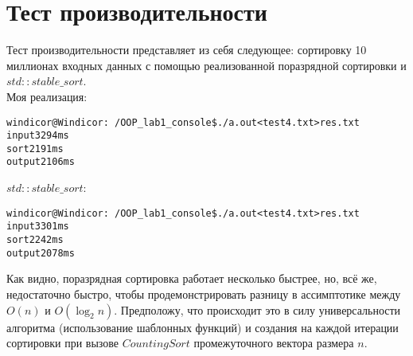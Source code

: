 \section{Тест производительности}

Тест производительности представляет из себя следующее: сортировку 10 миллионах входных данных с помощью реализованной поразрядной сортировки и $std::stable\_sort$.\\

Моя реализация:
\begin{alltt}
windicor@Windicor:~/OOP_lab1_console\$ ./a.out <test4.txt >res.txt
input3294 ms
sort2191 ms
output2106 ms
\end{alltt}

$std::stable\_sort$:
\begin{alltt}
windicor@Windicor:~/OOP_lab1_console\$ ./a.out <test4.txt >res.txt
input3301 ms
sort2242 ms
output2078 ms
\end{alltt}

Как видно, поразрядная сортировка работает несколько быстрее, но, всё же, недостаточно быстро, чтобы продемонстрировать разницу в ассимптотике между $O(n)$ и $O(\log_2n)$. Предположу, что происходит это в силу универсальности алгоритма (использование шаблонных функций) и создания на каждой итерации сортировки при вызове $CountingSort$ промежуточного вектора размера $n$.

\pagebreak


